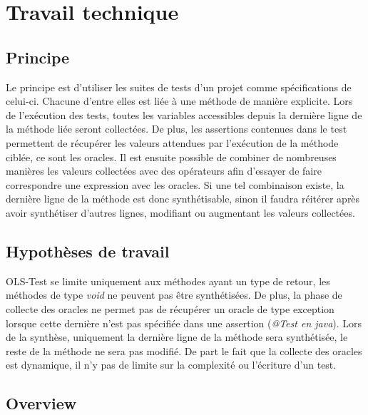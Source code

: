 

\chapter{Travail technique}
	\thispagestyle{document}
	
\section{Principe}
\label{sec:principe}

\par Le principe est d'utiliser les suites de tests d'un projet comme spécifications de celui-ci. Chacune d'entre elles est liée à une méthode de manière explicite. Lors de l'exécution des tests, toutes les variables accessibles depuis la dernière ligne de la méthode liée seront collectées. De plus, les assertions contenues dans le test permettent de récupérer les valeurs attendues par l'exécution de la méthode ciblée, ce sont les oracles. Il est ensuite possible de combiner de nombreuses manières les valeurs collectées avec des opérateurs afin d'essayer de faire correspondre une expression avec les oracles. Si une tel combinaison existe, la dernière ligne de la méthode est donc synthétisable, sinon il faudra réitérer après avoir synthétiser d'autres lignes, modifiant ou augmentant les valeurs collectées.

\section{Hypothèses de travail}
\label{sec:hypotheses}


\par OLS-Test se limite uniquement aux méthodes ayant un type de retour, les méthodes de type \textit{void} ne peuvent pas être synthétisées. De plus, la phase de collecte des oracles ne permet pas de récupérer un oracle de type exception lorsque cette dernière n'est pas spécifiée dans une assertion (\textit{@Test en java}). Lors de la synthèse, uniquement la dernière ligne de la méthode sera synthétisée, le reste de la méthode ne sera pas modifié. De part le fait que la collecte des oracles est dynamique, il n'y pas de limite sur la complexité ou l'écriture d'un test.



\section{Overview}
\label{sec:overview}

